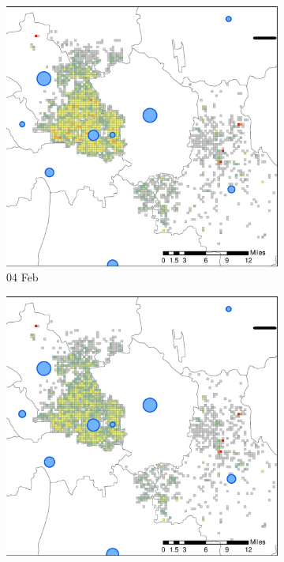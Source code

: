\documentclass[preprints,ijgi,submit,moreauthors]{Definitions/mdpi}
\begin{document}
\begin{figure}[H]
    \vspace{6pt}    
    \begin{subfigure}{.3\textwidth}
        \includegraphics[width=\textwidth]{Figures/Figure7/NewDistrictSSBD2020_02_04.eps}
        \caption{04 Feb}
    \end{subfigure}
    \begin{subfigure}{.3\textwidth}
        \includegraphics[width=\textwidth]{Figures/Figure7/NewDistrictSSBD2020_02_08.eps}

\end{subfigure}
\end{figure}
\end{document}
